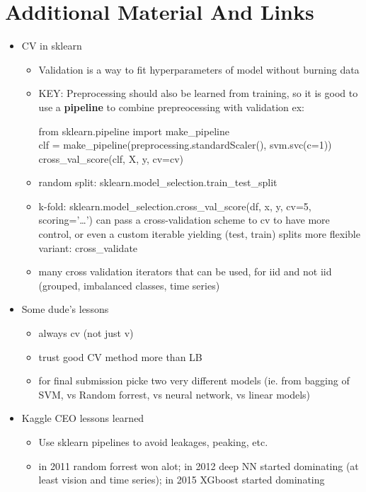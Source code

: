 \documentclass[a4paper]{report}
\newcommand{\brown}{\color{brown}}
\newenvironment{tightcenter}{
  \setlength\topsep{0pt}
  \setlength\parskip{0pt}
  \begin{center}
  }{
  \end{center}
}
\newenvironment{codesnip}[1]
{\begin{tightcenter}\begin{minipage}{.85\textwidth}#1}
{\end{minipage}\end{tightcenter}}
\begin{document}
\section{Additional Material And Links}
\begin{itemize}
  \item CV in sklearn
    \begin{itemize}
      \item Validation is a way to fit hyperparameters of model without burning data
      \item KEY: Preprocessing should also be learned from training, so it is good to use a {\bf pipeline} to combine prepreocessing with validation
	\subitem ex:
	\begin{codesnip}{\brown}
	  from sklearn.pipeline import make\_pipeline\\
	  clf = make\_pipeline(preprocessing.standardScaler(), svm.svc(c=1))\\
	  cross\_val\_score(clf, X, y, cv=cv)
	\end{codesnip}
      \item random split: {\brown sklearn.model\_selection.train\_test\_split}
      \item k-fold: {\brown sklearn.model\_selection.cross\_val\_score(df, x, y, cv=5, scoring='\ldots')}
	\subitem can pass a cross-validation scheme to cv to have more control, or even a custom iterable yielding (test, train) splits
	\subitem more flexible variant: cross\_validate
      \item many cross validation iterators that can be used, for iid and not iid (grouped, imbalanced classes, time series)
    \end{itemize}
  \item Some dude's lessons
    \begin{itemize}
      \item always cv (not just v)
      \item trust good CV method more than LB
      \item for final submission picke two very different models (ie. from bagging of SVM, vs Random forrest, vs neural network, vs linear models)
    \end{itemize}
  \item Kaggle CEO lessons learned
    \begin{itemize}
      \item Use sklearn pipelines to avoid leakages, peaking, etc.
      \item in 2011 random forrest won alot; in 2012 deep NN started dominating (at least vision and time series); in 2015 XGboost started dominating

\end{itemize}
\end{itemize}
\end{document}
